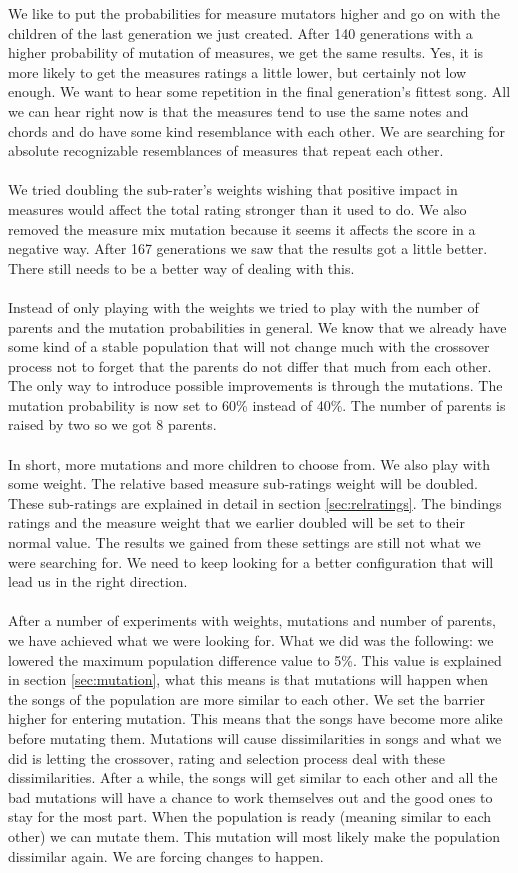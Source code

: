\documentclass[a4paper]{article}
\begin{document}
We like to put the probabilities for measure mutators higher and go on with the children of the last generation we just created. After 140 generations with a higher probability of mutation of measures, we get the same results. Yes, it is more likely to get the measures ratings a little lower, but certainly not low enough. We want to hear some repetition in the final generation's fittest song. All we can hear right now is that the measures tend to use the same notes and chords and do have some kind resemblance with each other. We are searching for absolute recognizable resemblances of measures that repeat each other.
\\\\
We tried doubling the sub-rater's weights wishing that positive impact in measures would affect the total rating stronger than it used to do. We also removed the measure mix mutation because it seems it affects the score in a negative way. After 167 generations we saw that the results got a little better. There still needs to be a better way of dealing with this.
\\\\
Instead of only playing with the weights we tried to play with the number of parents and the mutation probabilities in general. We know that we already have some kind of a stable population that will not change much with the crossover process not to forget that the parents do not differ that much from each other. The only way to introduce possible improvements is through the mutations. The mutation probability is now set to 60\% instead of 40\%. The number of parents is raised by two so we got 8 parents. 
\\\\
In short, more mutations and more children to choose from. We also play with some weight. The relative based measure sub-ratings weight will be doubled. These sub-ratings are explained in detail in section \ref{sec:relratings}. The bindings ratings and the measure weight that we earlier doubled will be set to their normal value. The results we gained from these settings are still not what we were searching for. We need to keep looking for a better configuration that will lead us in the right direction.
\\\\
After a number of experiments with weights, mutations and number of parents, we have achieved what we were looking for. What we did was the following: we lowered the maximum population difference value to 5\%. This value is explained in section \ref{sec:mutation}, what this means is that mutations will happen when the songs of the population are more similar to each other. We set the barrier higher for entering mutation. This means that the songs have become more alike before mutating them. Mutations will cause dissimilarities in songs and what we did is letting the crossover, rating and selection process deal with these dissimilarities. After a while, the songs will get similar to each other and all the bad mutations will have a chance to work themselves out and the good ones to stay for the most part. When the population is ready (meaning similar to each other) we can mutate them. This mutation will most likely make the population dissimilar again. We are forcing changes to happen.
\end{document}
